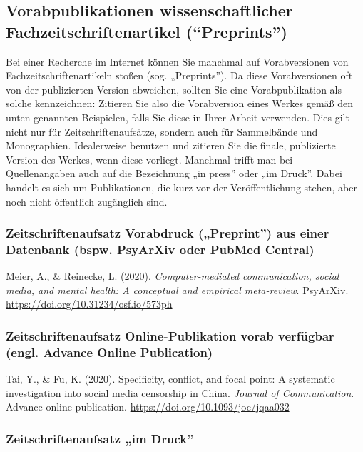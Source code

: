 \documentclass[
  letterpaper,
  DIV=11]{scrreprt}
\begin{document}
\subsection{Vorabpublikationen wissenschaftlicher
Fachzeitschriftenartikel
(``Preprints'')}\label{vorabpublikationen-wissenschaftlicher-fachzeitschriftenartikel-preprints}

Bei einer Recherche im Internet können Sie manchmal auf Vorabversionen
von Fachzeitschriftenartikeln stoßen (sog. „Preprints''). Da diese
Vorabversionen oft von der publizierten Version abweichen, sollten Sie
eine Vorabpublikation als solche kennzeichnen: Zitieren Sie also die
Vorabversion eines Werkes gemäß den unten genannten Beispielen, falls
Sie diese in Ihrer Arbeit verwenden. Dies gilt nicht nur für
Zeitschriftenaufsätze, sondern auch für Sammelbände und Monographien.
Idealerweise benutzen und zitieren Sie die finale, publizierte Version
des Werkes, wenn diese vorliegt. Manchmal trifft man bei Quellenangaben
auch auf die Bezeichnung „in press'' oder „im Druck''. Dabei handelt es
sich um Publikationen, die kurz vor der Veröffentlichung stehen, aber
noch nicht öffentlich zugänglich sind.

\subsubsection{Zeitschriftenaufsatz \textbar{} Vorabdruck („Preprint'')
aus einer Datenbank (bspw. PsyArXiv oder PubMed
Central)}\label{zeitschriftenaufsatz-vorabdruck-preprint-aus-einer-datenbank-bspw.-psyarxiv-oder-pubmed-central}

Meier, A., \& Reinecke, L. (2020). \emph{Computer-mediated
communication, social media, and mental health: A conceptual and
empirical meta-review}. PsyArXiv.
\url{https://doi.org/10.31234/osf.io/573ph}

\subsubsection{Zeitschriftenaufsatz \textbar{} Online-Publikation vorab
verfügbar (engl. Advance Online
Publication)}\label{zeitschriftenaufsatz-online-publikation-vorab-verfuxfcgbar-engl.-advance-online-publication}

Tai, Y., \& Fu, K. (2020). Specificity, conflict, and focal point: A
systematic investigation into social media censorship in China.
\emph{Journal of Communication}. Advance online publication.
\url{https://doi.org/10.1093/joc/jqaa032}

\subsubsection{Zeitschriftenaufsatz \textbar{} „im
Druck''}\label{zeitschriftenaufsatz-im-druck}
\end{document}
